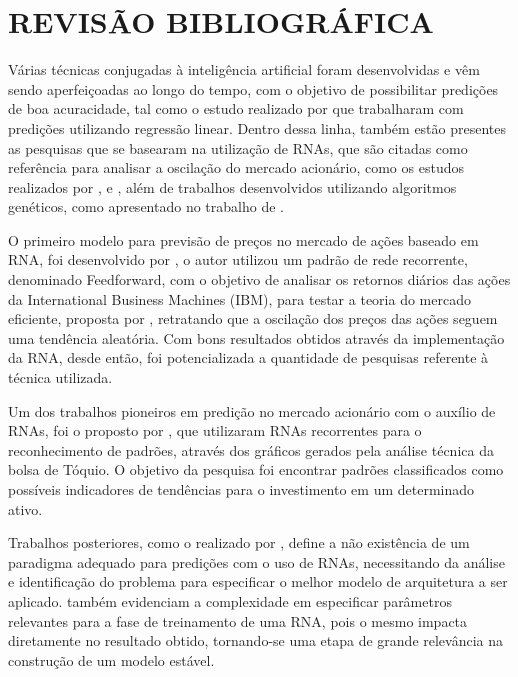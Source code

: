 
\chapter{REVISÃO BIBLIOGRÁFICA}\label{ch:rev-bibs}

Várias técnicas conjugadas à inteligência artificial foram desenvolvidas e vêm sendo aperfeiçoadas ao longo do tempo, com o objetivo de possibilitar predições de boa acuracidade, tal como o estudo realizado por  que trabalharam com predições utilizando regressão linear. Dentro dessa linha, também estão presentes as pesquisas que se basearam na utilização de RNAs, que são citadas como referência para analisar a oscilação do mercado acionário, como os estudos realizados por ,  e , além de trabalhos desenvolvidos utilizando algoritmos genéticos, como apresentado no trabalho de .

O primeiro modelo para previsão de preços no mercado de ações baseado em RNA, foi desenvolvido por , o autor utilizou um padrão de rede recorrente, denominado Feedforward, com o objetivo de analisar os retornos diários das ações da International Business Machines (IBM), para testar a teoria do mercado eficiente, proposta por , retratando que a oscilação dos preços das ações seguem uma tendência aleatória. Com bons resultados obtidos através da implementação da RNA, desde então, foi potencializada a quantidade de pesquisas referente à técnica utilizada.

Um dos trabalhos pioneiros em predição no mercado acionário com o auxílio de RNAs, foi o proposto por , que utilizaram RNAs recorrentes para o reconhecimento de padrões, através dos gráficos gerados pela análise técnica da bolsa de Tóquio. O objetivo da pesquisa foi encontrar padrões classificados como possíveis indicadores de tendências para o investimento em um determinado ativo.  

Trabalhos posteriores, como o realizado por , define a não existência de um paradigma adequado para predições com o uso de RNAs, necessitando da análise e identificação do problema para especificar o melhor modelo de arquitetura a ser aplicado.  também evidenciam a complexidade em especificar parâmetros relevantes para a fase de treinamento de uma RNA, pois o mesmo impacta diretamente no resultado obtido, tornando-se uma etapa de grande relevância na construção de um modelo estável.


